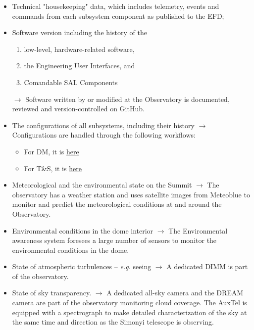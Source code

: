 \begin{itemize}
	\item Technical "housekeeping" data, which includes telemetry, events and commands from each subsystem component as published to the EFD;

	\item Software version including the history of the
	\begin{enumerate}
		\item low-level, hardware-related software,
		\item the Engineering User Interfaces, and
		\item Comandable SAL Components
	\end{enumerate}
	$\rightarrow$ Software written by or modified at the Observatory is documented, reviewed and version-controlled on GitHub.
	\item The configurations of all subsystems, including their history
	$\rightarrow$ Configurations are handled through the following workflows:
	\begin{itemize}
		\item For DM, it is \href{https://developer.lsst.io/work/flow.html}{here}
		\item For T\&S, it is \href{https://tssw-developer.lsst.io/work_management/development_workflow.html#development-workflow}{here}
	\end{itemize}

	\item Meteorological and the environmental state on the Summit\newline
	$\rightarrow$ The observatory has a weather station and uses satellite images from Meteoblue to monitor and predict the meteorological conditions at and around the Observatory.

	\item Environmental conditions in the dome interior\newline
	$\rightarrow$ The Environmental awareness system foresees a large number of sensors to monitor the environmental conditions in the dome.

	\item State of atmospheric turbulences -- {\it e.g.} seeing \newline
	$\rightarrow$ A dedicated DIMM is part of the observatory.

	\item State of sky transparency.\newline
	$\rightarrow$ A dedicated all-sky camera and the DREAM camera are part of the observatory monitoring cloud coverage.
	The AuxTel is equipped with a spectrograph to make detailed characterization of the sky at the same time and direction as the Simonyi telescope is observing.

\end{itemize}

